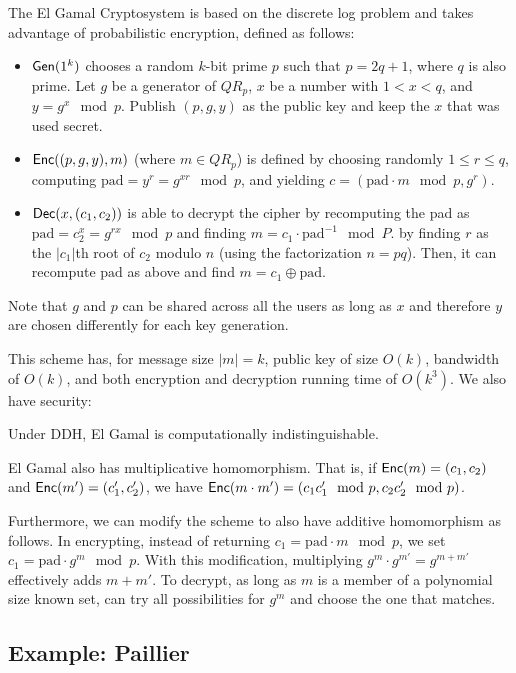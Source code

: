 \documentclass[10pt]{article}
\begin{document}
The El Gamal Cryptosystem is based on the discrete log problem and takes advantage of probabilistic encryption, defined as follows:
\begin{itemize}
	\item $\mathsf{Gen}(1^k)$ chooses a random $k$-bit prime $p$ such that $p=2q+1$, where $q$ is also prime. Let $g$ be a generator of $QR_p$, $x$ be a number with $1 < x < q$, and $y = g^x \mod p$. Publish $(p,g,y)$ as the public key and keep the $x$ that was used secret.
	\item $\mathsf{Enc}((p,g,y),m)$ (where $m \in QR_p$) is defined by choosing randomly $1 \le r \le q$, computing $\text{pad} = y^r = g^{xr} \mod p$, and yielding $c = (\text{pad} \cdot m \mod p, g^{r})$.
	\item $\mathsf{Dec}(x,(c_1, c_2))$ is able to decrypt the cipher by recomputing the pad as $\text{pad} = c_2^x = g^{rx} \mod p$ and finding $m = c_1 \cdot \text{pad}^{-1} \mod P$. by finding $r$ as the $|c_1|$th root of $c_2$ modulo $n$ (using the factorization $n=pq$). Then, it can recompute $\text{pad}$ as above and find $m = c_1 \oplus \text{pad}$.
\end{itemize}
Note that $g$ and $p$ can be shared across all the users as long as $x$ and therefore $y$ are chosen differently for each key generation. 

This scheme has, for message size $|m| = k$, public key of size $O(k)$, bandwidth of $O(k)$, and both encryption and decryption running time of $O(k^3)$. We also have security:
\begin{theorem}
Under DDH, El Gamal is computationally indistinguishable.
\end{theorem}

El Gamal also has multiplicative homomorphism. That is, if $\mathsf{Enc}(m) = (c_1, c_2)$ and $\mathsf{Enc}(m') = (c_1', c_2')$, we have $\mathsf{Enc}(m \cdot m') = (c_1c_1' \mod p, c_2c_2' \mod p)$. 

Furthermore, we can modify the scheme to also have additive homomorphism as follows. In encrypting, instead of returning $c_1 = \text{pad} \cdot m \mod p$, we set $c_1 = \text{pad} \cdot g^m \mod p$. With this modification, multiplying $g^m \cdot g^{m'} = g^{m+m'}$ effectively adds $m+m'$. To decrypt, as long as $m$ is a member of a polynomial size known set, can try all possibilities for $g^m$ and choose the one that matches.

\subsection{Example: Paillier}
\end{document}
